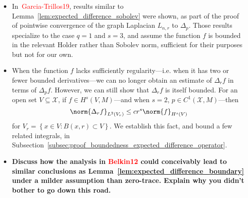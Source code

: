 \documentclass{article}
\newcommand{\set}[1]{\left\{#1\right\}}
\newcommand{\1}{\mathbf{1}}
\newcommand{\Lap}{L}
\newcommand{\Xset}{\mathcal{X}}
\newcommand{\Leb}{L}
\theoremstyle{alden}
\theoremstyle{aldenthm}
\theoremstyle{definition}
\theoremstyle{remark}
\begin{document}
\begin{itemize}
	\item In~\textcolor{red}{Garcia-Trillos19}, results similar to Lemma~\ref{lem:expected_difference_sobolev} were shown, as part of the proof of pointwise convergence of the graph Laplacian $\Lap_{n,r}$ to $\Delta_p$. Those results specialize to the case $q = 1$ and $s = 3$, and assume the function $f$ is bounded in the relevant Holder rather than Sobolev norm, sufficient for their purposes but not for our own. 
	\item When the function $f$ lacks sufficiently regularity---i.e. when it has two or fewer bounded derivatives---we can no longer obtain an estimate of  $\Delta_rf$ in terms of $\Delta_pf$. However, we can still show that $\Delta_rf$ is itself bounded. For an open set $V \subseteq \Xset$, if $f \in H^{s}(V,M)$---and when $s = 2$, $p \in C^{1}(\Xset,M)$---then
	\begin{equation}
	\label{eqn:norm_expected_difference_operator}
	\norm{\Delta_rf}_{\Leb^2(V_r)} \leq c r^s \norm{f}_{H^s(V)}
	\end{equation}
	for $V_r = \set{x \in V: B(x,r) \subset V}$. We establish this fact, and bound a few related integrals, in Subsection~\ref{subsec:proof_boundedness_expected_difference_operator}.
	\item \textbf{Discuss how the analysis in \textcolor{red}{Belkin12} could conceivably lead to similar conclusions as Lemma~\ref{lem:expected_difference_boundary} under a milder assumption than zero-trace. Explain why you didn't bother to go down this road.}
\end{itemize}
\end{document}
